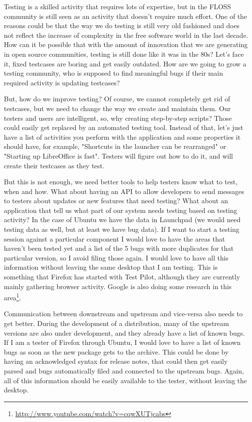 Testing is a skilled activity that requires lots of expertise, but in the FLOSS community is still seen as an activity that doesn't require much effort. One of the reasons could be that the way we do testing is still very old fashioned and does not reflect the increase of complexity in the free software world in the last decade. How can it be possible that with the amount of innovation that we are generating in open source communities, testing is still done like it was in the 80s? Let's face it, fixed testcases are boring and get easily outdated. How are we going to grow a testing community, who is supposed to find meaningful bugs if their main required activity is updating testcases?

But, how do we improve testing? Of course, we cannot completely get rid of testcases, but we need to change the way we create and maintain them. Our testers and users are intelligent, so, why creating step-by-step scripts? Those could easily get replaced by an automated testing tool. Instead of that, let's just have a list of activities you perform with the application and some properties it should have, for example, "Shortcuts in the launcher can be rearranged" or "Starting up LibreOffice is fast". Testers will figure out how to do it, and will create their testcases as they test.

But this is not enough, we need better tools to help testers know what to test, when and how.  What about having an API to allow developers to send messages to testers about updates or new features that need testing? What about an application that tell us what part of our system needs testing based on testing activity? In the case of Ubuntu we have the data in Launchpad (we would need testing data as well, but at least we have bug data). If I want to start a testing session against a particular component I would love to have the areas that haven't been tested yet and a list of the 5 bugs with more duplicates for that particular version, so I avoid filing those again. I would love to have all this information without leaving the same desktop that I am testing. This is something that Firefox has started with Test Pilot, although they are currently mainly gathering browser activity. Google is also doing some research in this area\footnote{\url{http://www.youtube.com/watch?v=cqwXUTjcabs}}.

Communication between downstream and upstream and vice-versa also needs to get better. During the development of a distribution, many of the upstream versions are also under development, and they already have a list of known bugs. If I am a tester of Firefox through Ubuntu, I would love to have a list of known bugs as soon as the new package gets to the archive. This could be done by having an acknowledged syntax for release notes, that could then get easily parsed and bugs automatically filed and connected to the upstream bugs. Again, all of this information should be easily available to the tester, without leaving the desktop.

